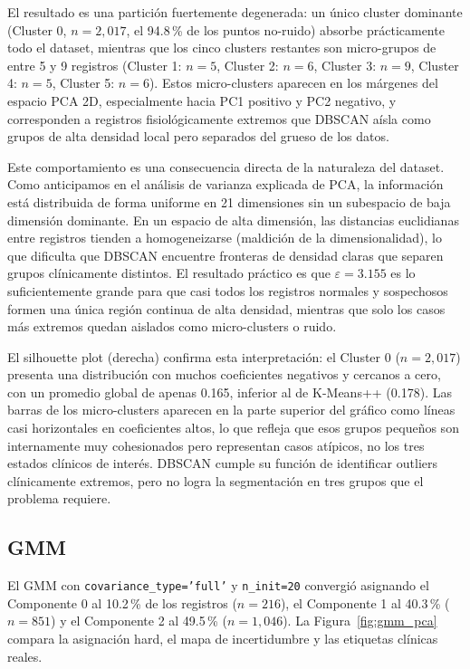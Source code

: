 \documentclass[12pt,letterpaper]{article}
\begin{document}
El resultado es una partición fuertemente degenerada: un único cluster dominante
(Cluster 0, $n=2{,}017$, el 94.8\,\% de los puntos no-ruido) absorbe prácticamente
todo el dataset, mientras que los cinco clusters restantes son micro-grupos de entre
5 y 9 registros (Cluster 1: $n=5$, Cluster 2: $n=6$, Cluster 3: $n=9$, Cluster 4:
$n=5$, Cluster 5: $n=6$). Estos micro-clusters aparecen en los márgenes del espacio
PCA 2D, especialmente hacia PC1 positivo y PC2 negativo, y corresponden a registros
fisiológicamente extremos que DBSCAN aísla como grupos de alta densidad local pero
separados del grueso de los datos.

Este comportamiento es una consecuencia directa de la naturaleza del dataset. Como
anticipamos en el análisis de varianza explicada de PCA, la información está distribuida
de forma uniforme en 21 dimensiones sin un subespacio de baja dimensión dominante.
En un espacio de alta dimensión, las distancias euclidianas entre registros tienden a
homogeneizarse (maldición de la dimensionalidad), lo que dificulta que DBSCAN encuentre
fronteras de densidad claras que separen grupos clínicamente distintos. El resultado
práctico es que $\varepsilon = 3.155$ es lo suficientemente grande para que casi todos
los registros normales y sospechosos formen una única región continua de alta densidad,
mientras que solo los casos más extremos quedan aislados como micro-clusters o ruido.

El silhouette plot (derecha) confirma esta interpretación: el Cluster 0 ($n=2{,}017$)
presenta una distribución con muchos coeficientes negativos y cercanos a cero, con un
promedio global de apenas 0.165, inferior al de K-Means++ (0.178). Las barras de los
micro-clusters aparecen en la parte superior del gráfico como líneas casi horizontales
en coeficientes altos, lo que refleja que esos grupos pequeños son internamente muy
cohesionados pero representan casos atípicos, no los tres estados clínicos de interés.
DBSCAN cumple su función de identificar outliers clínicamente extremos, pero no logra
la segmentación en tres grupos que el problema requiere.

\subsection{GMM}

El GMM con \texttt{covariance\_type='full'} y \texttt{n\_init=20} convergió asignando
el Componente 0 al 10.2\,\% de los registros ($n=216$), el Componente 1 al 40.3\,\%
($n=851$) y el Componente 2 al 49.5\,\% ($n=1{,}046$). La Figura~\ref{fig:gmm_pca}
compara la asignación hard, el mapa de incertidumbre y las etiquetas clínicas reales.
\end{document}
